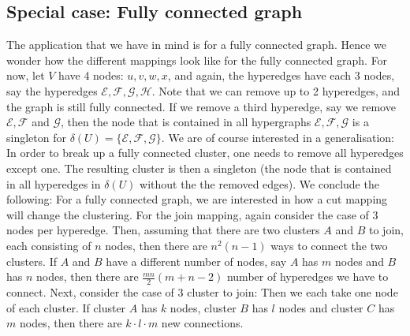 \subsection{Special case: Fully connected graph}
The application that we have in mind is for a fully connected graph. Hence we wonder how the different mappings look like for the fully connected graph. For now, let $V$ have 4 nodes: $u,v,w,x$, and again, the hyperedges have each $3$ nodes, say the hyperedges $\mathcal{E}, \mathcal{F}, \mathcal{G}, \mathcal{H}$. 
Note that we can remove up to 2 hyperedges, and the graph is still fully connected. If we remove a third hyperedge, say we remove $\mathcal{E}, \mathcal{F}$ and $\mathcal{G}$, then the node that is contained in all hypergraphs $\mathcal{E}, \mathcal{F}, \mathcal{G}$ is a singleton for $\delta(U)=\{ \mathcal{E}, \mathcal{F}, \mathcal{G} \}$. We are of course interested in a generalisation: In order to break up a fully connected cluster, one needs to remove all hyperedges except one. The resulting cluster is then a singleton (the node that is contained in all hyperedges in $\delta(U)$ without the  the removed edges). We conclude the following: For a fully connected graph, we are interested in how a cut mapping will change the clustering. For the join mapping, again consider the case of 3 nodes per hyperedge. Then, assuming that there are two clusters $A$ and $B$ to join, each consisting of $n$ nodes, then there are $n^2(n-1)$ ways to connect the two clusters. If $A$ and $B$ have a different number of nodes, say $A$ has $m$ nodes and $B$ has $n$ nodes, then there are $\frac{mn}{2}(m+n-2)$ number of hyperedges we have to connect. Next, consider the case of $3$ cluster to join: Then we each take one node of each cluster. If cluster $A$ has $k$ nodes, cluster $B$ has $l$ nodes and cluster $C$ has $m$ nodes, then there are $k \cdot l \cdot m$ new connections. 





